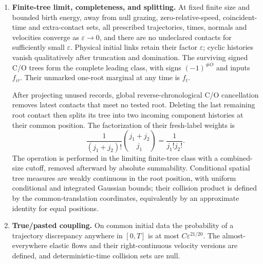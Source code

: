 \documentclass[11pt,letterpaper]{article}
\numberwithin{equation}{section}
\theoremstyle{definition}\newtheorem{assumption}[theorem]{Assumption}
\theoremstyle{remark}\newtheorem{remark}[theorem]{Remark}
\newcommand{\eps}{\varepsilon}\newcommand{\dd}{\,\mathrm d}
\begin{document}
\begin{enumerate}[label=H\arabic*.,ref=H\arabic*,leftmargin=2.7em]
\item\label{imp:tree} \textbf{Finite-tree limit, completeness, and splitting.}
At fixed finite size and bounded birth energy, away from null grazing, zero-relative-speed, coincident-time and extra-contact sets, all prescribed trajectories, times, normals and velocities converge as $\eps\to0$, and there are no undeclared contacts for sufficiently small $\eps$. Physical initial links retain their factor $\eps$; cyclic histories vanish qualitatively after truncation and domination. The surviving signed C/O trees form the complete leading class, with signs $(-1)^{\#O}$ and inputs $f_{i\tau}$. Their unmarked one-root marginal at any time is $f_t$.

After projecting unused records, global reverse-chronological C/O cancellation removes latest contacts that meet no tested root. Deleting the last remaining root contact then splits its tree into two incoming component histories at their common position. The factorization of their fresh-label weights is
\[
 \frac1{(j_1+j_2)!}\binom{j_1+j_2}{j_1}=\frac1{j_1!j_2!}.
\]
The operation is performed in the limiting finite-tree class with a combined-size cutoff, removed afterward by absolute summability. Conditional spatial tree measures are weakly continuous in the root position, with uniform conditional and integrated Gaussian bounds; their collision product is defined by the common-translation coordinates, equivalently by an approximate identity for equal positions.

\item\label{imp:coupling} \textbf{True/pasted coupling.}
On common initial data the probability of a trajectory discrepancy anywhere in $[0,T]$ is at most $C\eps^{21/20}$. The almost-everywhere elastic flows and their right-continuous velocity versions are defined, and deterministic-time collision sets are null.
\end{enumerate}
\end{document}
